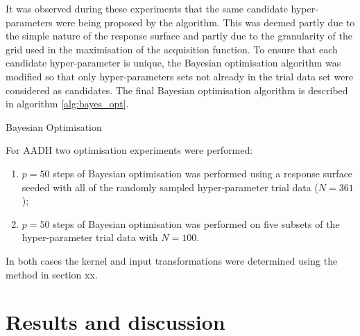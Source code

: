 It was observed during these experiments that the same candidate hyper-parameters were being proposed by the algorithm. This was deemed partly due to the simple nature of the response surface and partly due to the granularity of the grid used in the maximisation of the acquisition function. To ensure that each candidate hyper-parameter is unique, the Bayesian optimisation algorithm was modified so that only  hyper-parameters sets not already in the trial data set were considered as candidates. The final Bayesian optimisation algorithm is described in algorithm \ref{alg:bayes_opt}.

\begin{algorithm}\label{alg:bayes_opt}
\BlankLine
{}
\caption{Bayesian Optimisation}
\end{algorithm}

For AADH two optimisation experiments were performed:
\begin{enumerate}
    \item $p=50$ steps of Bayesian optimisation was performed using a response surface seeded with all of the randomly sampled hyper-parameter trial data ($N=361$);
    \item $p=50$ steps of Bayesian optimisation was performed on five subsets  of the hyper-parameter trial data with  $N=100$.
\end{enumerate} 
In both cases the kernel and input transformations were determined using the method in section xx. 


\section{Results and discussion}
